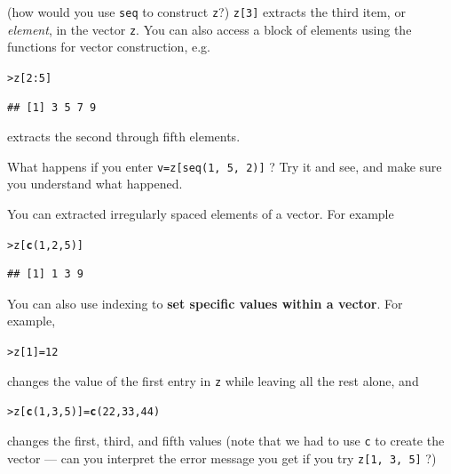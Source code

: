 \documentclass[11pt]{article}\usepackage[]{graphicx}\usepackage[]{color}
\makeatletter
\newcommand{\hlnum}[1]{\textcolor[rgb]{0.686,0.059,0.569}{#1}}%
\newcommand{\hlopt}[1]{\textcolor[rgb]{0,0,0}{#1}}%
\newcommand{\hlstd}[1]{\textcolor[rgb]{0.345,0.345,0.345}{#1}}%
\newcommand{\hlkwb}[1]{\textcolor[rgb]{0.69,0.353,0.396}{#1}}%
\newcommand{\hlkwd}[1]{\textcolor[rgb]{0.737,0.353,0.396}{\textbf{#1}}}%
\newenvironment{kframe}{%
 \def\at@end@of@kframe{}%
 \ifinner\ifhmode%
  \def\at@end@of@kframe{\end{minipage}}%
  \begin{minipage}{\columnwidth}%
 \fi\fi%
 \def\FrameCommand##1{\hskip\@totalleftmargin \hskip-\fboxsep
 \colorbox{shadecolor}{##1}\hskip-\fboxsep
     \hskip-\linewidth \hskip-\@totalleftmargin \hskip\columnwidth}%
 \MakeFramed {\advance\hsize-\width
   \@totalleftmargin\z@ \linewidth\hsize
   \@setminipage}}%
 {\par\unskip\endMakeFramed%
 \at@end@of@kframe}
\newenvironment{knitrout}{}{} %
\newcommand{\code}[1]{{\tt #1}}
\numberwithin{exercise}{section}
\makeatother
\begin{document}
(how would you use \code{seq} to construct \code{z}?)
\code{z[3]} extracts the third item, or \emph{element}, in the vector \code{z}. 
You can also access a block of elements using the functions for 
vector construction, e.g. 
\begin{knitrout}
\color{fgcolor}\begin{kframe}
\begin{alltt}
\hlstd{> }\hlstd{z[}\hlnum{2}\hlopt{:}\hlnum{5}\hlstd{]}
\end{alltt}
\begin{verbatim}
## [1] 3 5 7 9
\end{verbatim}
\end{kframe}
\end{knitrout}
extracts the second through fifth elements.

What happens if you enter \code{v=z[seq(1, 5, 2)]} ? Try it
and see, and make sure you understand what happened. 

You can extracted irregularly spaced elements of a vector. For example
\begin{knitrout}
\color{fgcolor}\begin{kframe}
\begin{alltt}
\hlstd{> }\hlstd{z[}\hlkwd{c}\hlstd{(}\hlnum{1}\hlstd{,} \hlnum{2}\hlstd{,} \hlnum{5}\hlstd{)]}
\end{alltt}
\begin{verbatim}
## [1] 1 3 9
\end{verbatim}
\end{kframe}
\end{knitrout}

You can also use indexing to \textbf{set specific values within a vector}. For 
example, 
\begin{knitrout}
\color{fgcolor}\begin{kframe}
\begin{alltt}
\hlstd{> }\hlstd{z[}\hlnum{1}\hlstd{]} \hlkwb{=} \hlnum{12}
\end{alltt}
\end{kframe}
\end{knitrout}
changes the value of the first entry in \code{z} while leaving 
all the rest alone, and 
\begin{knitrout}
\color{fgcolor}\begin{kframe}
\begin{alltt}
\hlstd{> }\hlstd{z[}\hlkwd{c}\hlstd{(}\hlnum{1}\hlstd{,} \hlnum{3}\hlstd{,} \hlnum{5}\hlstd{)]} \hlkwb{=} \hlkwd{c}\hlstd{(}\hlnum{22}\hlstd{,} \hlnum{33}\hlstd{,} \hlnum{44}\hlstd{)}
\end{alltt}
\end{kframe}
\end{knitrout}
changes the first, third, and fifth values 
(note that we had to use \code{c} to create the vector --- %
can you interpret the error message you get if you
try \code{z[1, 3, 5]} ?)
\end{document}
